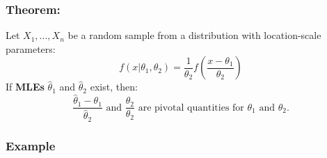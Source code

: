 \documentclass{article}
\begin{document}
\subsubsection*{Theorem:}
Let $X_1,...,X_n$ be a random sample from a distribution with location-scale parameters:
\begin{equation*}
    f(x|\theta_1,\theta_2) = \frac{1}{\theta_2} f\left(\frac{x-\theta_1}{\theta_2}\right)
\end{equation*}
If \textbf{MLEs} $\hat{\theta}_1$ and $\hat{\theta}_2$ exist, then:
\begin{equation*}
    \frac{\hat{\theta}_1 - \theta_1}{\hat{\theta}_2} \text{ and } \frac{\hat{\theta}_2}{\theta_2} \text{ are pivotal quantities for $\theta_1$ and $\theta_2$.}
\end{equation*}

\subsubsection{Example}
\end{document}
